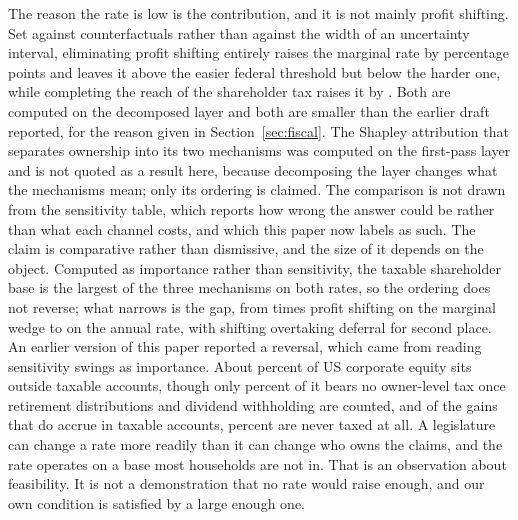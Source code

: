 The reason the rate is low is the contribution, and it is not mainly profit shifting. Set against
counterfactuals rather than against the width of an uncertainty interval, eliminating profit
shifting entirely raises the marginal rate by  percentage points and leaves
it above the easier federal threshold but below the harder one, while completing the reach of the
shareholder tax raises it by
. Both are computed on the decomposed layer and both are smaller than the
earlier draft reported, for the reason given in Section~\ref{sec:fiscal}. The Shapley attribution that separates ownership into its two
mechanisms was computed on the first-pass layer and is not quoted as a result here, because
decomposing the layer changes what the mechanisms mean; only its ordering is claimed. The comparison is not drawn from the sensitivity table, which reports how wrong the
answer could be rather than what each channel costs, and which this paper now labels as such. The
claim is comparative rather than dismissive, and the size of it depends on the object. Computed as
importance rather than sensitivity, the taxable shareholder base is the largest of the three
mechanisms on both rates, so the ordering does not reverse; what narrows is the gap, from
 times profit shifting on the marginal wedge to  on the annual
rate, with shifting overtaking deferral for second place. An earlier version of this paper
reported a reversal, which came from reading sensitivity swings as importance.
About
 percent of US corporate equity sits outside taxable accounts, though only
 percent of it bears no owner-level tax once retirement distributions
and dividend withholding are counted, and of the gains that do accrue in taxable accounts,
 percent are never taxed at all. A legislature can change a rate
more readily than it can change who owns the claims, and the rate operates on a base most
households are not in. That is an observation about feasibility. It is not a demonstration that
no rate would raise enough, and our own condition is satisfied by a large enough one.

